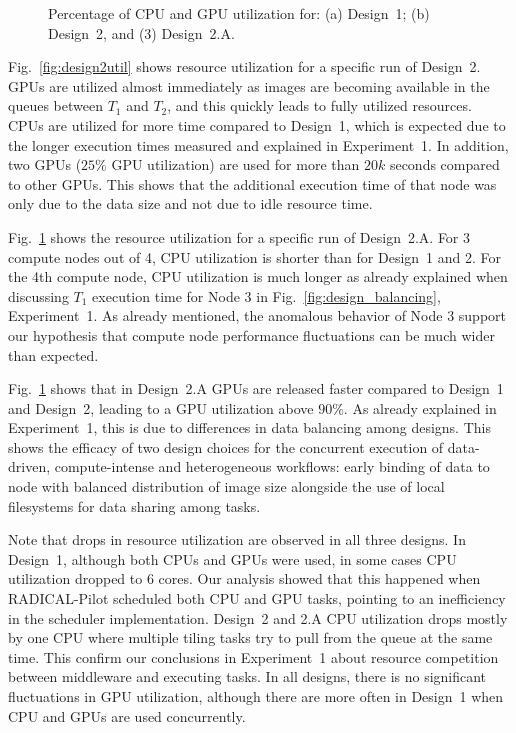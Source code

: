 \begin{figure}[ht!]
\begin{subfigure}[b]{0.33\textwidth}
        \caption{}
        \label{fig:design2autil}
    \end{subfigure}
    \caption{Percentage of CPU and GPU utilization for: (a) Design~1; (b)
        Design~2, and (3) Design~2.A.}
    \label{fig:Utilization}
\end{figure}


Fig.~\ref{fig:design2util} shows resource utilization for a specific run of Design~2.
GPUs are utilized almost immediately as images are becoming available in the queues between $T_{1}$ and $T_{2}$, and this quickly leads to fully utilized resources.
CPUs are utilized for more time compared to Design~1, which is expected due to the longer execution times measured and explained in Experiment~1.
In addition, two GPUs ($25\%$ GPU utilization) are used for more than $20k$ seconds compared to other GPUs.
This shows that the additional execution time of that node was only due to the data size and not due to idle resource time.

Fig.~\ref{fig:design2autil} shows the resource utilization for a specific run of Design~2.A.
For 3 compute nodes out of 4, CPU utilization is shorter than for Design~1 and 2.
For the 4th compute node, CPU utilization is much longer as already explained when discussing $T_{1}$ execution time for Node 3 in Fig.~\ref{fig:design_balancing}, Experiment~1.
As already mentioned, the anomalous behavior of Node 3 support our hypothesis that compute node performance fluctuations can be much wider than expected.

Fig.~\ref{fig:design2autil} shows that in Design~2.A GPUs are released faster compared to Design~1 and Design~2, leading to a GPU utilization above $90\%$.
As already explained in Experiment~1, this is due to differences in data balancing among designs.
This shows the efficacy of two design choices for the concurrent execution of data-driven, compute-intense and heterogeneous workflows: early binding of data to node with balanced distribution of image size alongside the use of local filesystems for data sharing among tasks.

Note that drops in resource utilization are observed in all three designs.
In Design~1, although both CPUs and GPUs were used, in some cases CPU utilization dropped to 6 cores.
Our analysis showed that this happened when RADICAL-Pilot scheduled both CPU and GPU tasks, pointing to an inefficiency in the scheduler implementation.
Design~2 and 2.A CPU utilization drops mostly by one CPU where multiple tiling tasks try to pull from the queue at the same time.
This confirm our conclusions in Experiment~1 about resource competition between middleware and executing tasks.
In all designs, there is no significant fluctuations in GPU utilization, although there are more often in Design~1 when CPU and GPUs are used concurrently.

